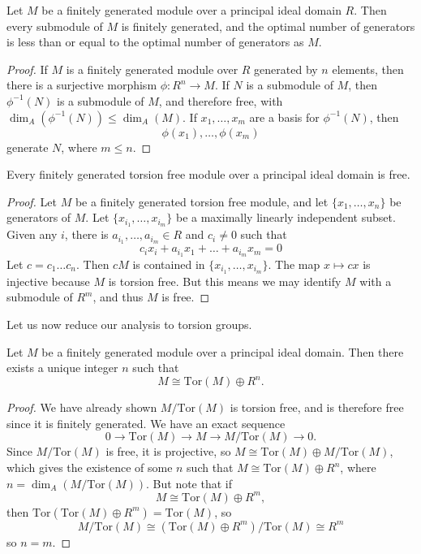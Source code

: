 \begin{corollary}
    Let $M$ be a finitely generated module over a principal ideal domain $R$. Then every submodule of $M$ is finitely generated, and the optimal number of generators is less than or equal to the optimal number of generators as $M$.
\end{corollary}
\begin{proof}
    If $M$ is a finitely generated module over $R$ generated by $n$ elements, then there is a surjective morphism $\phi: R^n \to M$. If $N$ is a submodule of $M$, then $\phi^{-1}(N)$ is a submodule of $M$, and therefore free, with $\dim_A(\phi^{-1}(N)) \leq \dim_A(M)$. If $x_1,\dots,x_m$ are a basis for $\phi^{-1}(N)$, then
    \[ \phi(x_1),\dots, \phi(x_m) \]
    generate $N$, where $m \leq n$.
\end{proof}

\begin{lemma}
    Every finitely generated torsion free module over a principal ideal domain is free.
\end{lemma}
\begin{proof}
    Let $M$ be a finitely generated torsion free module, and let $\{ x_1, \dots, x_n \}$ be generators of $M$. Let $\{ x_{i_1}, \dots, x_{i_m} \}$ be a maximally linearly independent subset. Given any $i$, there is $a_{i_1}, \dots, a_{i_m} \in R$ and $c_i \neq 0$ such that
    \[ c_ix_i + a_{i_1} x_1 + \dots + a_{i_m} x_m = 0 \]
    Let $c = c_1 \dots c_n$. Then $cM$ is contained in $\{ x_{i_1}, \dots, x_{i_m} \}$. The map $x \mapsto cx$ is injective because $M$ is torsion free. But this means we may identify $M$ with a submodule of $R^m$, and thus $M$ is free.
\end{proof}

Let us now reduce our analysis to torsion groups.

\begin{lemma}
    Let $M$ be a finitely generated module over a principal ideal domain. Then there exists a unique integer $n$ such that
    \[ M \cong \text{Tor}(M) \oplus R^n. \]
\end{lemma}
\begin{proof}
    We have already shown $M/\text{Tor}(M)$ is torsion free, and is therefore free since it is finitely generated. We have an exact sequence
    \[ 0 \to \text{Tor}(M) \to M \to M/\text{Tor}(M) \to 0. \]
    Since $M/\text{Tor}(M)$ is free, it is projective, so $M \cong \text{Tor}(M) \oplus M/\text{Tor}(M)$, which gives the existence of some $n$ such that $M \cong \text{Tor}(M) \oplus R^n$, where $n = \dim_A(M/\text{Tor}(M))$. But note that if
    \[ M \cong \text{Tor}(M) \oplus R^m, \]
    then $\text{Tor}(\text{Tor}(M) \oplus R^m) = \text{Tor}(M)$, so
    \[ M/\text{Tor}(M) \cong (\text{Tor}(M) \oplus R^m) / \text{Tor}(M) \cong R^m \]
    so $n = m$.
\end{proof}

